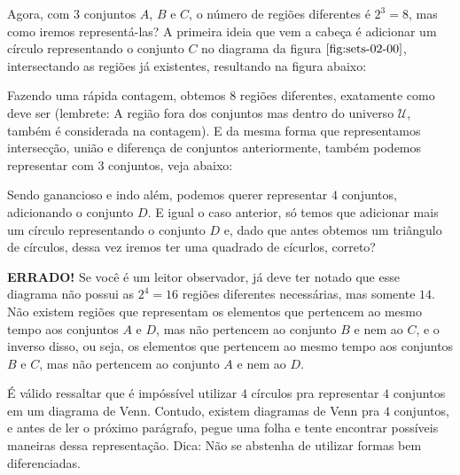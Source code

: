  Agora, com $3$ conjuntos $A$, $B$ e $C$, o número de regiões diferentes é $2^3=8$, mas como iremos representá-las? A primeira ideia que vem a cabeça é adicionar um círculo representando o conjunto $C$ no diagrama da figura $\ref{fig:sets-02-00}$, intersectando as regiões já existentes, resultando na figura abaixo:

  Fazendo uma rápida contagem, obtemos $8$ regiões diferentes, exatamente como deve ser (lembrete: A região fora dos conjuntos mas dentro do universo $\mathcal U$, também é considerada na contagem). E da mesma forma que representamos intersecção, união e diferença de conjuntos anteriormente, também podemos representar com $3$ conjuntos, veja abaixo:




  Sendo ganancioso e indo além, podemos querer representar $4$ conjuntos, adicionando o conjunto $D$. E igual o caso anterior, só temos que adicionar mais um círculo representando o conjunto $D$ e, dado que antes obtemos um triângulo de círculos, dessa vez iremos ter uma quadrado de cícurlos, correto?

  \textbf{ERRADO!} Se você é um leitor observador, já deve ter notado que esse diagrama não possui as $2^4=16$ regiões diferentes necessárias, mas somente $14$. Não existem regiões que representam os elementos que pertencem ao mesmo tempo aos conjuntos $A$ e $D$, mas não pertencem ao conjunto $B$ e nem ao $C$, e o inverso disso, ou seja, os elementos que pertencem ao mesmo tempo aos conjuntos $B$ e $C$, mas não pertencem ao conjunto $A$ e nem ao $D$.

  É válido ressaltar que é impóssível utilizar $4$ círculos pra representar $4$ conjuntos em um diagrama de Venn. Contudo, existem diagramas de Venn pra $4$ conjuntos, e antes de ler o próximo parágrafo, pegue uma folha e tente encontrar possíveis maneiras dessa representação. Dica: Não se abstenha de utilizar formas bem diferenciadas. 
  
